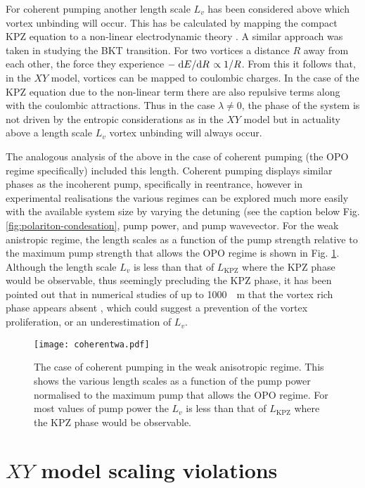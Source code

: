 \documentclass[letterpaper, 10 pt, conference]{IEEEtran}  %
\newcommand{\fig}[1]{Fig. #1}
\begin{document}
For coherent pumping another length scale $L_v$ has been considered above which vortex unbinding will occur. 
This has be calculated by mapping the compact KPZ equation to a non-linear electrodynamic theory \cite{PhysRevB.94.104520}.
A similar approach was taken in studying the BKT transition. 
For two vortices a distance $R$ away from each other, the force they experience $-\dv*{E}{R} \propto 1/R$. 
From this it follows that, in the $XY$ model, vortices can be mapped to coulombic charges. 
In the case of the KPZ equation due to the non-linear term there are also repulsive terms along with the coulombic attractions. 
Thus in the case $\lambda \neq 0$, the phase of the system is not driven by the entropic considerations as in the $XY$ model but in actuality above a length scale $L_v$ vortex unbinding will always occur. 

The analogous analysis of the above in the case of coherent pumping (the OPO regime specifically) included this length.
Coherent pumping displays similar phases as the incoherent pump, specifically in reentrance, however in experimental realisations the various regimes can be explored much more easily with the available system size by varying the detuning (see the caption below \fig{\ref{fig:polariton-condesation}}, pump power, and pump wavevector. 
For the weak anistropic regime, the length scales as a function of the pump strength relative to the maximum pump strength that allows the OPO regime is shown in \fig{\ref{fig:coherentwa}}.
Although the length scale $L_v$ is less than that of $L_{\textrm{KPZ}}$ where the KPZ phase would be observable, thus seemingly precluding the KPZ phase, it has been pointed out that in numerical studies of up to \SI{1000}{\mu \meter} that the vortex rich phase appears absent \cite{PhysRevX.5.041028}, which could suggest a prevention of the vortex proliferation, or an underestimation of $L_v$.
\begin{figure}[htbp!]
	\centering
	\texttt{[image: coherentwa.pdf]}
	\caption{The case of coherent pumping in the weak anisotropic regime. This shows the various length scales as a function of the pump power normalised to the maximum pump that allows the OPO regime. For most values of pump power the $L_v$ is less than that of $L_{\textrm{KPZ}}$ where the KPZ phase would be observable.}
	\label{fig:coherentwa}
\end{figure}

\section{$XY$ model scaling violations}
\end{document}
